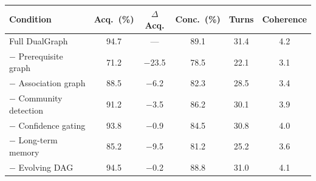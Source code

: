 \begin{tabular}{@{}lccccc@{}}
\toprule
\textbf{Condition} & \textbf{Acq.\ (\%)} & $\Delta$\textbf{Acq.}
  & \textbf{Conc.\ (\%)} & \textbf{Turns} & \textbf{Coherence} \\
\midrule
Full DualGraph & 94.7 & --- & 89.1 & 31.4 & 4.2 \\
$-$ Prerequisite graph & 71.2 & $-$23.5 & 78.5 & 22.1 & 3.1 \\
$-$ Association graph & 88.5 & $-$6.2 & 82.3 & 28.5 & 3.4 \\
$-$ Community detection & 91.2 & $-$3.5 & 86.2 & 30.1 & 3.9 \\
$-$ Confidence gating & 93.8 & $-$0.9 & 84.5 & 30.8 & 4.0 \\
$-$ Long-term memory & 85.2 & $-$9.5 & 81.2 & 25.2 & 3.6 \\
$-$ Evolving DAG & 94.5 & $-$0.2 & 88.8 & 31.0 & 4.1 \\
\bottomrule
\end{tabular}
